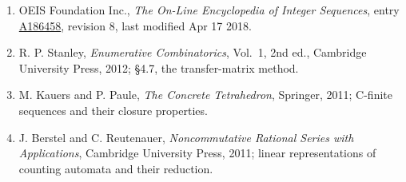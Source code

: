 \documentclass[11pt]{article}
\theoremstyle{definition}
\begin{document}
\begin{enumerate}

\item OEIS Foundation Inc., \emph{The On-Line Encyclopedia of Integer Sequences}, entry \href{https://oeis.org/A186458}{A186458}, revision 8, last modified Apr 17 2018.

\item R. P. Stanley, \emph{Enumerative Combinatorics}, Vol.~1, 2nd ed., Cambridge University Press, 2012; \S4.7, the transfer-matrix method.

\item M. Kauers and P. Paule, \emph{The Concrete Tetrahedron}, Springer, 2011; C-finite sequences and their closure properties.

\item J. Berstel and C. Reutenauer, \emph{Noncommutative Rational Series with Applications}, Cambridge University Press, 2011; linear representations of counting automata and their reduction.

\end{enumerate}
\end{document}
